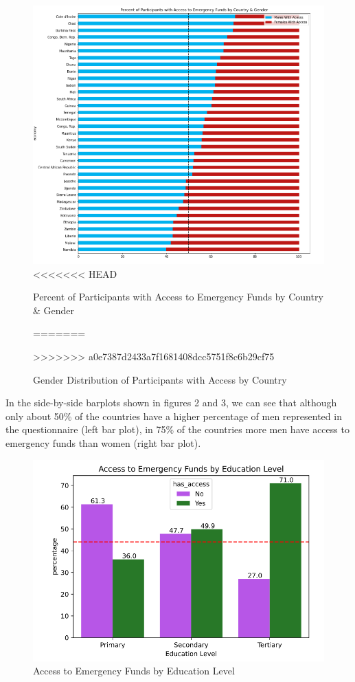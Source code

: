 \documentclass[water,article,submit,moreauthors,pdftex]{mdpi}
\begin{document}
\begin{figure}
\centering
\includegraphics[width=\textwidth,height=0.5\textheight]{images/percent_access_funds_by_country_gender.png}
<<<<<<< HEAD
\caption{Percent of Participants with Access to Emergency Funds by
Country \& Gender}
=======
\caption{Gender Distribution of Participants with Access by Country}
>>>>>>> a0e7387d2433a7f1681408dcc5751f8c6b29cf75
\end{figure}

In the side-by-side barplots shown in figures 2 and 3, we can see that
although only about 50\% of the countries have a higher percentage of
men represented in the questionnaire (left bar plot), in 75\% of the
countries more men have access to emergency funds than women (right bar
plot).

\begin{figure}
\centering
\includegraphics[width=\textwidth,height=0.5\textheight]{images/access_by_educ_level.png}
\caption{Access to Emergency Funds by Education Level}
\end{figure}
\end{document}
